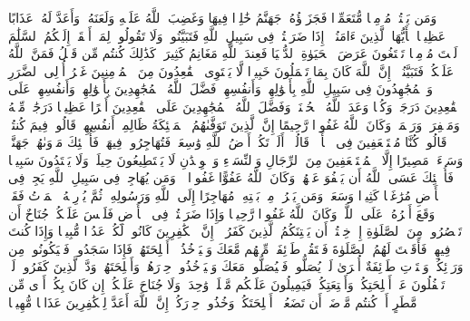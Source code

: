 \stopbuffer%
\startbuffer[\q:4:93]
وَمَن یَقۡتُلۡ مُؤۡمِنࣰا مُّتَعَمِّدࣰا فَجَزَاۤؤُهُۥ جَهَنَّمُ خَٰلِدࣰا فِیهَا وَغَضِبَ ٱللَّهُ عَلَیۡهِ وَلَعَنَهُۥ وَأَعَدَّ لَهُۥ عَذَابًا عَظِیمࣰا%
\stopbuffer%
\startbuffer[\q:4:94]
یَٰۤأَیُّهَا ٱلَّذِینَ ءَامَنُوۤا۟ إِذَا ضَرَبۡتُمۡ فِی سَبِیلِ ٱللَّهِ فَتَبَیَّنُوا۟ وَلَا تَقُولُوا۟ لِمَنۡ أَلۡقَىٰۤ إِلَیۡكُمُ ٱلسَّلَٰمَ لَسۡتَ مُؤۡمِنࣰا تَبۡتَغُونَ عَرَضَ ٱلۡحَیَوٰةِ ٱلدُّنۡیَا فَعِندَ ٱللَّهِ مَغَانِمُ كَثِیرَةࣱۚ كَذَٰلِكَ كُنتُم مِّن قَبۡلُ فَمَنَّ ٱللَّهُ عَلَیۡكُمۡ فَتَبَیَّنُوۤا۟ۚ إِنَّ ٱللَّهَ كَانَ بِمَا تَعۡمَلُونَ خَبِیرࣰا%
\stopbuffer%
\startbuffer[\q:4:95]
لَّا یَسۡتَوِی ٱلۡقَٰعِدُونَ مِنَ ٱلۡمُؤۡمِنِینَ غَیۡرُ أُو۟لِی ٱلضَّرَرِ وَٱلۡمُجَٰهِدُونَ فِی سَبِیلِ ٱللَّهِ بِأَمۡوَٰلِهِمۡ وَأَنفُسِهِمۡۚ فَضَّلَ ٱللَّهُ ٱلۡمُجَٰهِدِینَ بِأَمۡوَٰلِهِمۡ وَأَنفُسِهِمۡ عَلَى ٱلۡقَٰعِدِینَ دَرَجَةࣰۚ وَكُلࣰّا وَعَدَ ٱللَّهُ ٱلۡحُسۡنَىٰۚ وَفَضَّلَ ٱللَّهُ ٱلۡمُجَٰهِدِینَ عَلَى ٱلۡقَٰعِدِینَ أَجۡرًا عَظِیمࣰا%
\stopbuffer%
\startbuffer[\q:4:96]
دَرَجَٰتࣲ مِّنۡهُ وَمَغۡفِرَةࣰ وَرَحۡمَةࣰۚ وَكَانَ ٱللَّهُ غَفُورࣰا رَّحِیمًا%
\stopbuffer%
\startbuffer[\q:4:97]
إِنَّ ٱلَّذِینَ تَوَفَّىٰهُمُ ٱلۡمَلَٰۤئِكَةُ ظَالِمِیۤ أَنفُسِهِمۡ قَالُوا۟ فِیمَ كُنتُمۡۖ قَالُوا۟ كُنَّا مُسۡتَضۡعَفِینَ فِی ٱلۡأَرۡضِۚ قَالُوۤا۟ أَلَمۡ تَكُنۡ أَرۡضُ ٱللَّهِ وَٰسِعَةࣰ فَتُهَاجِرُوا۟ فِیهَاۚ فَأُو۟لَٰۤئِكَ مَأۡوَىٰهُمۡ جَهَنَّمُۖ وَسَاۤءَتۡ مَصِیرًا%
\stopbuffer%
\startbuffer[\q:4:98]
إِلَّا ٱلۡمُسۡتَضۡعَفِینَ مِنَ ٱلرِّجَالِ وَٱلنِّسَاۤءِ وَٱلۡوِلۡدَٰنِ لَا یَسۡتَطِیعُونَ حِیلَةࣰ وَلَا یَهۡتَدُونَ سَبِیلࣰا%
\stopbuffer%
\startbuffer[\q:4:99]
فَأُو۟لَٰۤئِكَ عَسَى ٱللَّهُ أَن یَعۡفُوَ عَنۡهُمۡۚ وَكَانَ ٱللَّهُ عَفُوًّا غَفُورࣰا%
\stopbuffer%
\startbuffer[\q:4:100]
۞ وَمَن یُهَاجِرۡ فِی سَبِیلِ ٱللَّهِ یَجِدۡ فِی ٱلۡأَرۡضِ مُرَٰغَمࣰا كَثِیرࣰا وَسَعَةࣰۚ وَمَن یَخۡرُجۡ مِنۢ بَیۡتِهِۦ مُهَاجِرًا إِلَى ٱللَّهِ وَرَسُولِهِۦ ثُمَّ یُدۡرِكۡهُ ٱلۡمَوۡتُ فَقَدۡ وَقَعَ أَجۡرُهُۥ عَلَى ٱللَّهِۗ وَكَانَ ٱللَّهُ غَفُورࣰا رَّحِیمࣰا%
\stopbuffer%
\startbuffer[\q:4:101]
وَإِذَا ضَرَبۡتُمۡ فِی ٱلۡأَرۡضِ فَلَیۡسَ عَلَیۡكُمۡ جُنَاحٌ أَن تَقۡصُرُوا۟ مِنَ ٱلصَّلَوٰةِ إِنۡ خِفۡتُمۡ أَن یَفۡتِنَكُمُ ٱلَّذِینَ كَفَرُوۤا۟ۚ إِنَّ ٱلۡكَٰفِرِینَ كَانُوا۟ لَكُمۡ عَدُوࣰّا مُّبِینࣰا%
\stopbuffer%
\startbuffer[\q:4:102]
وَإِذَا كُنتَ فِیهِمۡ فَأَقَمۡتَ لَهُمُ ٱلصَّلَوٰةَ فَلۡتَقُمۡ طَاۤئِفَةࣱ مِّنۡهُم مَّعَكَ وَلۡیَأۡخُذُوۤا۟ أَسۡلِحَتَهُمۡۖ فَإِذَا سَجَدُوا۟ فَلۡیَكُونُوا۟ مِن وَرَاۤئِكُمۡ وَلۡتَأۡتِ طَاۤئِفَةٌ أُخۡرَىٰ لَمۡ یُصَلُّوا۟ فَلۡیُصَلُّوا۟ مَعَكَ وَلۡیَأۡخُذُوا۟ حِذۡرَهُمۡ وَأَسۡلِحَتَهُمۡۗ وَدَّ ٱلَّذِینَ كَفَرُوا۟ لَوۡ تَغۡفُلُونَ عَنۡ أَسۡلِحَتِكُمۡ وَأَمۡتِعَتِكُمۡ فَیَمِیلُونَ عَلَیۡكُم مَّیۡلَةࣰ وَٰحِدَةࣰۚ وَلَا جُنَاحَ عَلَیۡكُمۡ إِن كَانَ بِكُمۡ أَذࣰى مِّن مَّطَرٍ أَوۡ كُنتُم مَّرۡضَىٰۤ أَن تَضَعُوۤا۟ أَسۡلِحَتَكُمۡۖ وَخُذُوا۟ حِذۡرَكُمۡۗ إِنَّ ٱللَّهَ أَعَدَّ لِلۡكَٰفِرِینَ عَذَابࣰا مُّهِینࣰا%
